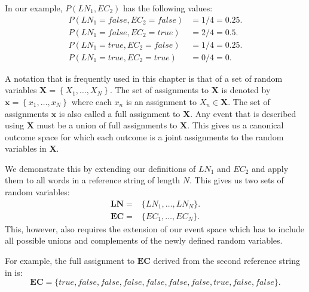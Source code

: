 In our example, $P(LN_1,EC_2)$ has the following values:
\begin{equation*}
  \begin{split}
    P(LN_1{=}\mathit{false},EC_2{=}\mathit{false})&=1/4=0.25.\\
    P(LN_1{=}\mathit{false},EC_2{=}\mathit{true})&=2/4=0.5.\\
    P(LN_1{=}\mathit{true},EC_2{=}\mathit{false})&=1/4=0.25.\\
    P(LN_1{=}\mathit{true},EC_2{=}\mathit{true})&=0/4=0.
  \end{split}
\end{equation*}

\bigskip

A notation that is frequently used in this chapter is that of a set of \glspl{random variable} $\mathbf{X}=\left\{ X_1,\dots,X_N\right\}$.
The set of \glspl{assignment} to $\mathbf{X}$ is denoted by $\mathbf{x}=\left\{ x_1,\dots,x_N\right\}$ where each $x_n$ is an \gls{assignment} to $X_n\in\mathbf{X}$.
The set of \glspl{assignment} $\mathbf{x}$ is also called a \gls{full assignment} to $\mathbf{X}$.
Any \gls{event} that is described using $\mathbf{X}$ must be a union of \glspl{full assignment} to $\mathbf{X}$.
This gives us a \gls{canonical outcome space} for which each outcome is a joint \glspl{assignment} to the \glspl{random variable} in $\mathbf{X}$.

We demonstrate this by extending our definitions of $LN_1$ and $EC_2$ and apply them to all words in a reference string of length $N$.
This gives us two sets of \glspl{random variable}:
\begin{equation*}
  \begin{split}
    \mathbf{LN}=& \{LN_1, \dots, LN_N\}.\\
    \mathbf{EC}=& \{EC_1, \dots, EC_N\}.
  \end{split}
\end{equation*}
This, however, also requires the extension of our \gls{event space}  which has to include all possible unions and complements of the newly defined \glspl{random variable}.

For example, the \gls{full assignment} to $\mathbf{EC}$ derived from the second reference string in  is:
\begin{equation*}
  \mathbf{EC}=\{\mathit{true}, \mathit{false}, \mathit{false}, \mathit{false}, \mathit{false}, \mathit{false}, \mathit{false}, \mathit{true}, \mathit{false}, \mathit{false}\}.
\end{equation*}

